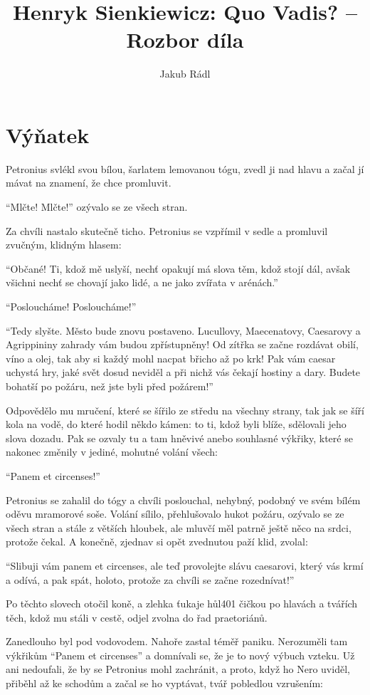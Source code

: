 \documentclass[10pt,a4paper]{article}
\date{}
\author{Jakub Rádl}
\title{Henryk Sienkiewicz: Quo Vadis? -- Rozbor díla}
\begin{document}
\maketitle

\section*{Výňatek}
Petronius svlékl svou bílou, šarlatem lemovanou tógu, zvedl ji nad hlavu a začal jí mávat na znamení, že chce promluvit.

“Mlčte! Mlčte!” ozývalo se ze všech stran.

Za chvíli nastalo skutečně ticho. Petronius se vzpřímil v sedle a promluvil zvučným, klidným hlasem:

“Občané! Ti, kdož mě uslyší, nechť opakují má slova těm, kdož stojí dál, avšak všichni nechť
se chovají jako lidé, a ne jako zvířata v arénách.”

“Posloucháme! Posloucháme!”

“Tedy slyšte. Město bude znovu postaveno. Lucullovy, Maecenatovy, Caesarovy a Agrippininy zahrady vám budou zpřístupněny! Od zítřka se začne rozdávat obilí, víno a olej, tak aby si každý mohl nacpat břicho až po krk! Pak vám caesar uchystá hry, jaké svět dosud neviděl a při nichž vás čekají hostiny a dary. Budete bohatší po požáru, než jste byli před požárem!”

Odpovědělo mu mručení, které se šířilo ze středu na všechny strany, tak jak se šíří kola na vodě, do které hodil někdo kámen: to ti, kdož byli blíže, sdělovali jeho slova dozadu. Pak se ozvaly tu a tam hněvivé anebo souhlasné výkřiky, které se nakonec změnily v jediné, mohutné volání všech:

“Panem et circenses!”

Petronius se zahalil do tógy a chvíli poslouchal, nehybný, podobný ve svém bílém oděvu mramorové soše. Volání sílilo, přehlušovalo hukot požáru, ozývalo se ze všech stran a stále z větších hloubek, ale mluvčí měl patrně ještě něco na srdci, protože čekal. A konečně, zjednav si opět zvednutou paží klid, zvolal:

“Slibuji vám panem et circenses, ale teď provolejte slávu caesarovi, který vás krmí a odívá, a pak spát, holoto, protože za chvíli se začne rozednívat!”

Po těchto slovech otočil koně, a zlehka ťukaje hůl401 čičkou po hlavách a tvářích těch, kdož
mu stáli v cestě, odjel zvolna do řad praetoriánů.

Zanedlouho byl pod vodovodem. Nahoře zastal téměř paniku. Nerozuměli tam výkřikům
“Panem et circenses” a domnívali se, že je to nový výbuch vzteku. Už ani nedoufali, že by se Petronius mohl zachránit, a proto, když ho Nero uviděl, přiběhl až ke schodům a začal se ho vyptávat, tvář pobledlou vzrušením:
\end{document}
